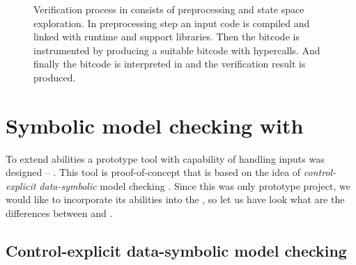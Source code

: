 \begin{figure}[!ht]
{
}
\caption{Verification process in \DIVINE consists of preprocessing and
state space exploration. In preprocessing step an input code is
compiled and linked with \DIOS runtime and \DIVINE support
libraries. Then the bitcode is instrumented by \LART producing a suitable \LLVM bitcode with \DIVM hypercalls. And finally the bitcode is interpreted in \DIVM and the verification result is produced.}\label{fig:verification}
\end{figure}

\section{Symbolic model checking with \SymDIVINE}\label{sub:symdivine}

To extend \DIVINE abilities a prototype tool with capability of handling inputs
was designed -- \SymDIVINE.  This tool is proof-of-concept that is based on the
idea of \emph{control-explicit data-symbolic} model checking \cite{Barnat14}.
Since this was only prototype project, we would like to incorporate its
abilities into the \DIVINE, so let us have look what are the differences between \DIVINE
and \SymDIVINE.

\subsection{Control-explicit data-symbolic model checking}

